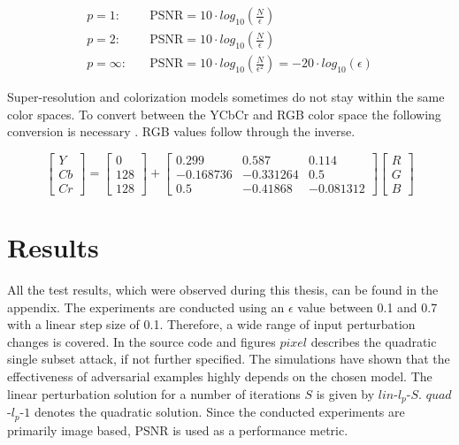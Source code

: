\begin{equation}
\begin{aligned}
p=1: \quad & \text{PSNR} = 10 \cdot log_{10} (\frac{N}{\epsilon}) \\[10pt]
p=2: \quad & \text{PSNR} = 10 \cdot log_{10} (\frac{N}{\epsilon}) \\[10pt]
p=\infty: \quad & \text{PSNR} = 10 \cdot log_{10} (\frac{N}{\epsilon^2}) = -20 \cdot log_{10} (\epsilon)
\end{aligned}
\label{psnr_simplify}
\end{equation}

\begingroup
Super-resolution and colorization models sometimes do not stay within the same color spaces. To convert between
the YCbCr and RGB color space the following conversion is necessary \cite{YCbCrConversion}. RGB values follow
through the inverse.
\endgroup

\begin{equation}
\begin{bmatrix}
Y \\
Cb \\
Cr
\end{bmatrix}
=
\begin{bmatrix}
0 \\
128 \\
128
\end{bmatrix}
+
\begin{bmatrix}
0.299 & 0.587 & 0.114 \\
-0.168736 & -0.331264 & 0.5 \\
0.5 & -0.41868 & -0.081312
\end{bmatrix}
\begin{bmatrix}
R \\
G \\
B
\end{bmatrix}
\end{equation}

\section{Results}\label{sec:section}

\begingroup
All the test results, which were observed during this thesis, can be found in the appendix.
The experiments are conducted using an $\epsilon$ value between 0.1 and 0.7 with a linear step size of 0.1.
Therefore, a wide range of input perturbation changes is covered.
In the source code and figures $pixel$ describes the quadratic single subset attack, if not further specified.
The simulations have shown that the effectiveness of adversarial examples highly depends on the chosen model.
The linear perturbation solution for a number of iterations $S$ is given by $lin$-$l_p$-$S$. $quad$-$l_p$-$1$ denotes the quadratic
solution. Since the conducted experiments are primarily image based, PSNR is used as a performance metric.

